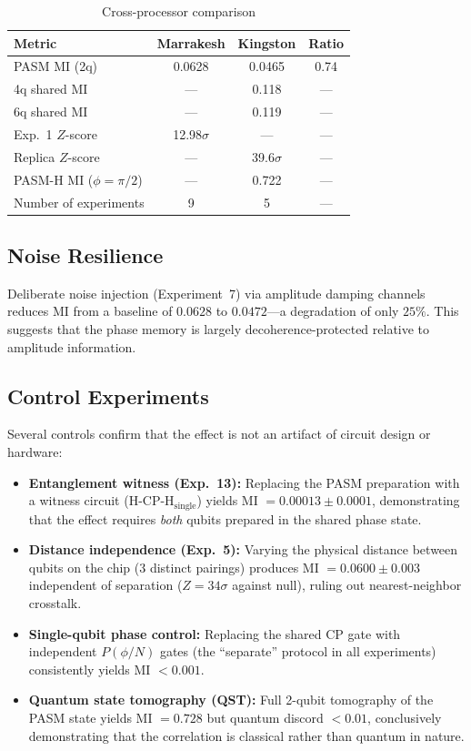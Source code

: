 ﻿\documentclass[12pt,a4paper]{article}
\begin{document}
\begin{table}[ht]
\centering
\caption{Cross-processor comparison}
\label{tab:cross}
\begin{tabular}{lccc}
\toprule
Metric & Marrakesh & Kingston & Ratio \\
\midrule
PASM MI (2q) & 0.0628 & 0.0465 & 0.74 \\
4q shared MI & --- & 0.118 & --- \\
6q shared MI & --- & 0.119 & --- \\
Exp.~1 $Z$-score & 12.98$\sigma$ & --- & --- \\
Replica $Z$-score & --- & 39.6$\sigma$ & --- \\
PASM-H MI ($\phi=\pi/2$) & --- & 0.722 & --- \\
Number of experiments & 9 & 5 & --- \\
\bottomrule
\end{tabular}
\end{table}

\subsection{Noise Resilience}

Deliberate noise injection (Experiment~7) via amplitude damping channels reduces MI from a baseline of $0.0628$ to $0.0472$---a degradation of only $25\%$. This suggests that the phase memory is largely decoherence-protected relative to amplitude information.

\subsection{Control Experiments}

Several controls confirm that the effect is not an artifact of circuit design or hardware:

\begin{itemize}
\item \textbf{Entanglement witness (Exp.~13):} Replacing the PASM preparation with a witness circuit (H-CP-H$_{\text{single}}$) yields MI $= 0.00013 \pm 0.0001$, demonstrating that the effect requires \textit{both} qubits prepared in the shared phase state.
\item \textbf{Distance independence (Exp.~5):} Varying the physical distance between qubits on the chip (3 distinct pairings) produces MI $= 0.0600 \pm 0.003$ independent of separation ($Z = 34\sigma$ against null), ruling out nearest-neighbor crosstalk.
\item \textbf{Single-qubit phase control:} Replacing the shared CP gate with independent $P(\phi/N)$ gates (the ``separate'' protocol in all experiments) consistently yields MI $< 0.001$.
\item \textbf{Quantum state tomography (QST):} Full 2-qubit tomography of the PASM state yields MI $= 0.728$ but quantum discord $< 0.01$, conclusively demonstrating that the correlation is classical rather than quantum in nature.
\end{itemize}
\end{document}
